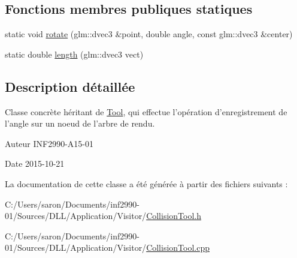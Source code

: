 \subsection*{Fonctions membres publiques statiques}
\begin{DoxyCompactItemize}
\item 
static void \hyperlink{group__inf2990_gabf47107895dd5a494323f678fd430385}{rotate} (glm\-::dvec3 \&point, double angle, const glm\-::dvec3 \&center)
\item 
static double \hyperlink{group__inf2990_gacde31d7d23d078dae0286e8f3088bb32}{length} (glm\-::dvec3 vect)
\end{DoxyCompactItemize}


\subsection{Description détaillée}
Classe concrète héritant de \hyperlink{class_tool}{Tool}, qui effectue l'opération d'enregistrement de l'angle sur un noeud de l'arbre de rendu. 

\begin{DoxyAuthor}{Auteur}
I\-N\-F2990-\/\-A15-\/01 
\end{DoxyAuthor}
\begin{DoxyDate}{Date}
2015-\/10-\/21 
\end{DoxyDate}


La documentation de cette classe a été générée à partir des fichiers suivants \-:\begin{DoxyCompactItemize}
\item 
C\-:/\-Users/saron/\-Documents/inf2990-\/01/\-Sources/\-D\-L\-L/\-Application/\-Visitor/\hyperlink{_collision_tool_8h}{Collision\-Tool.\-h}\item 
C\-:/\-Users/saron/\-Documents/inf2990-\/01/\-Sources/\-D\-L\-L/\-Application/\-Visitor/\hyperlink{_collision_tool_8cpp}{Collision\-Tool.\-cpp}\end{DoxyCompactItemize}
